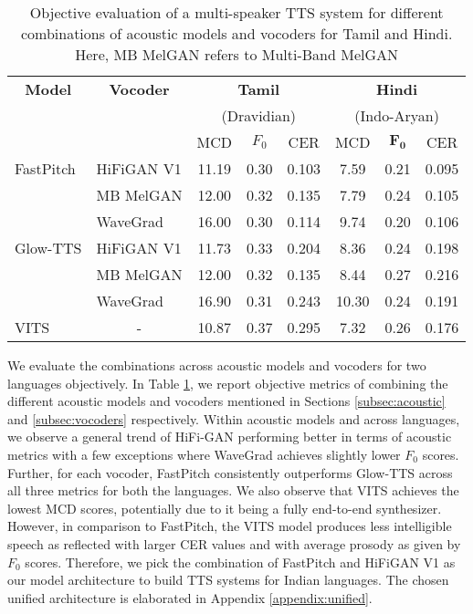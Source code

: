 \documentclass{article}
\begin{document}
\begin{table}[htp]
\centering
\begingroup
\setlength{\tabcolsep}{2pt} \renewcommand{\arraystretch}{1} \begin{tabular}{@{}llcclccl@{}}
\toprule
\multicolumn{1}{c}{\textbf{Model}} & \multicolumn{1}{c}{\textbf{Vocoder}} & \multicolumn{3}{c}{\textbf{Tamil }}                                                & \multicolumn{3}{c}{\textbf{Hindi}}       \\ 
\multicolumn{1}{c}{} & \multicolumn{1}{c}{} & \multicolumn{3}{c}{(Dravidian)}                                                & \multicolumn{3}{c}{(Indo-Aryan)} \\ 
 \cmidrule(l){3-5} \cmidrule(l){6-8}
                                   &                                      & MCD        & \emph{$F_0$}          & \multicolumn{1}{c}{CER} & MCD        & $\mathbf{F_0}$          & \multicolumn{1}{c}{CER} \\
\midrule                                   
FastPitch  & HiFiGAN V1              & 11.19 & 0.30 & 0.103 & 7.59  & 0.21 & 0.095 \\
           & MB MelGAN      & 12.00 & 0.32 & 0.135 & 7.79  & 0.24 & 0.105 \\
           & WaveGrad              & 16.00 & 0.30 & 0.114 & 9.74  & 0.20 & 0.106 \\ \midrule
Glow-TTS   & HiFiGAN V1              & 11.73 & 0.33 & 0.204 & 8.36  & 0.24 & 0.198 \\
           & MB MelGAN      & 12.00 & 0.32 & 0.135 & 8.44  & 0.27 & 0.216\\
           & WaveGrad              & 16.90 & 0.31 & 0.243 & 10.30 & 0.24 & 0.191 \\ \midrule
VITS & \multicolumn{1}{c}{-} & 10.87 & 0.37 & 0.295 & 7.32  & 0.26 & 0.176\\  \bottomrule
\end{tabular}
\endgroup
\caption{Objective evaluation of a multi-speaker TTS system for different combinations of acoustic models and vocoders for Tamil and Hindi. Here, MB MelGAN refers to Multi-Band MelGAN}
\label{tab:combo}
\end{table}
We evaluate the combinations across acoustic models and vocoders for two languages objectively. In Table \ref{tab:combo}, we report objective metrics of combining the different acoustic models and vocoders mentioned in Sections \ref{subsec:acoustic} and \ref{subsec:vocoders} respectively. Within acoustic models and across languages, we observe a general trend of HiFi-GAN performing better in terms of acoustic metrics with a few exceptions where WaveGrad achieves slightly lower $F_0$ scores. Further, for each vocoder, FastPitch consistently outperforms Glow-TTS across all three metrics for both the languages. We also observe that VITS achieves the lowest MCD scores, potentially due to it being a fully end-to-end synthesizer. However, in comparison to FastPitch, the VITS model produces less intelligible speech as reflected with larger CER values and with average prosody as given by $F_0$ scores. Therefore, we pick the combination of FastPitch and HiFiGAN V1 as our model architecture  to build TTS systems for Indian languages. The chosen unified architecture  is elaborated in Appendix \ref{appendix:unified}.
\end{document}
